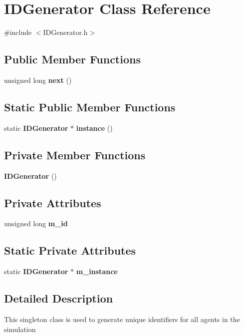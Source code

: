 \section{I\+D\+Generator Class Reference}
\label{class_i_d_generator}


{\ttfamily \#include $<$I\+D\+Generator.\+h$>$}

\subsection*{Public Member Functions}
\begin{DoxyCompactItemize}
\item 
unsigned long \textbf{ next} ()
\end{DoxyCompactItemize}
\subsection*{Static Public Member Functions}
\begin{DoxyCompactItemize}
\item 
static \textbf{ I\+D\+Generator} $\ast$ \textbf{ instance} ()
\end{DoxyCompactItemize}
\subsection*{Private Member Functions}
\begin{DoxyCompactItemize}
\item 
\textbf{ I\+D\+Generator} ()
\end{DoxyCompactItemize}
\subsection*{Private Attributes}
\begin{DoxyCompactItemize}
\item 
unsigned long \textbf{ m\+\_\+id}
\end{DoxyCompactItemize}
\subsection*{Static Private Attributes}
\begin{DoxyCompactItemize}
\item 
static \textbf{ I\+D\+Generator} $\ast$ \textbf{ m\+\_\+instance}
\end{DoxyCompactItemize}


\subsection{Detailed Description}
This singleton class is used to generate unique identifiers for all agents in the simulation 

